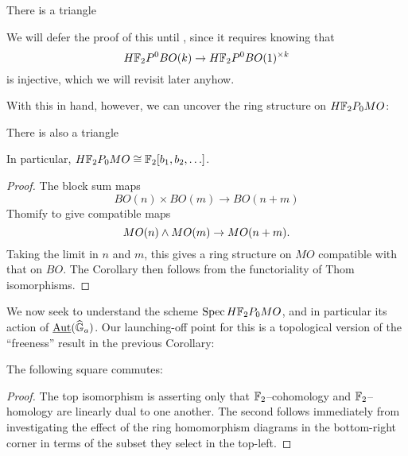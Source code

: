 \begin{corollary}
There is a triangle
\begin{center}
\end{center}
\end{corollary}
\noindent We will defer the proof of this until , since it requires knowing that \[H\mathbb F_2P^0 BO(k) \to H\mathbb F_2P^0 BO(1)^{\times k}\] is injective, which we will revisit later anyhow.

With this in hand, however, we can uncover the ring structure on $H\mathbb F_2P_0 MO$:
\begin{corollary}\label{HF2MOisFree}
There is also a triangle
\begin{center}
\end{center}
In particular, $H\mathbb F_2P_0 MO \cong \mathbb F_2[b_1, b_2, \ldots]$.
\end{corollary}
\begin{proof}
The block sum maps \[BO(n) \times BO(m) \to BO(n+m)\] Thomify to give compatible maps \[MO(n) \wedge MO(m) \to MO(n+m).\]  Taking the limit in $n$ and $m$, this gives a ring structure on $MO$ compatible with that on $BO$.  The Corollary then follows from the functoriality of Thom isomorphisms.
\end{proof}

We now seek to understand the scheme $\operatorname{Spec} H\mathbb F_2P_0 MO$, and in particular its action of $\operatorname{\underline{\smash{\operatorname{Aut}}}}(\widehat{\mathbb G}_a)$.  Our launching-off point for this is a topological version of the ``freeness'' result in the previous Corollary:
\begin{lemma}\label{DetectingMORingMapsInHomotopy}
The following square commutes:
\begin{center}
\end{center}
\end{lemma}
\begin{proof}
The top isomorphism is asserting only that $\mathbb F_2$--cohomology and $\mathbb F_2$--homology are linearly dual to one another.  The second follows immediately from investigating the effect of the ring homomorphism diagrams in the bottom-right corner in terms of the subset they select in the top-left.
\end{proof}

